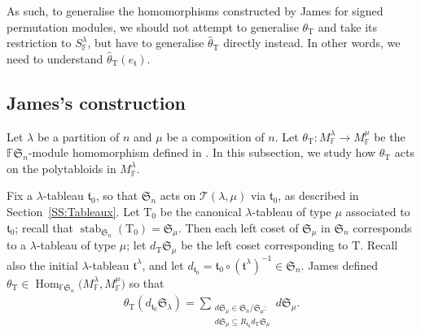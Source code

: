 \documentclass[pdftex]{sigma}
\renewcommand{\t}{\mathfrak{t}}
\newcommand{\TT}{\mathscr{T}}
\newcommand{\T}{\mathrm{T}}
\newcommand{\Hom}{\operatorname{Hom}}
\newcommand{\stab}{\operatorname{stab}}
\newcommand{\sym}[1]{\mathfrak{S}_{#1}}
\newcommand{\F}{\mathbb{F}}
\begin{document}
As such, to generalise the homomorphisms constructed by James for signed permutation modules, we should not attempt to generalise $\theta_\T$ and take its restriction to $S_\F^{\lambda}$, but have to generalise $\hat{\theta}_\T$ directly instead. In other words, we need to understand $\hat{\theta}_\T(e_\t)$.

\subsection{James's construction}
Let $\lambda$ be a partition of $n$ and $\mu$ be a composition of $n$. Let $\theta_{\T} \colon M_\F^{\lambda} \to M_\F^{\mu}$ be the $\F\sym{n}$-module homomorphism defined in \cite[Section~13]{GJ}. In this subsection, we study how $\theta_{\T}$ acts on the polytabloids in $M_\F^{\lambda}$.

Fix a $\lambda$-tableau $\t_0$, so that $\sym{n}$ acts on $\TT(\lambda,\mu)$ via $\t_0$, as described in Section~\ref{SS:Tableaux}.
Let $\T_0$ be the canonical $\lambda$-tableau of type $\mu$ associated to $\t_0$; recall that $\stab_{\sym{n}}(\T_0) = \sym{\mu}$.
Then each left coset of $\sym{\mu}$ in $\sym{n}$ corresponds to a $\lambda$-tableau of type $\mu$; let $d_\T\sym{\mu}$ be the left coset corresponding to $\T$.
Recall also the initial $\lambda$-tableau $\t^{\lambda}$, and let $d_{\t_0} = \t_0 \circ (\t^{\lambda})^{-1} \in \sym{n}$.
James defined $\theta_\T \in \Hom_{\F\sym{n}}\big(M_\F^{\lambda}, M_\F^{\mu}\big)$ so that
\begin{gather*}\theta_{\T}(d_{\t_0}\sym{\lambda}) = \sum_{\substack{d\sym{\mu} \in \sym{n}/\sym{\mu}: \\ d\sym{\mu} \subseteq R_{\t_0} d_\T \sym{\mu}}} d \sym{\mu}.\end{gather*}
\end{document}
